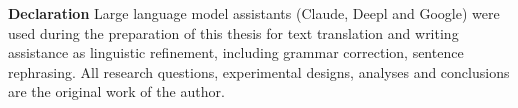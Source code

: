 \documentclass[a4paper,11pt]{article}
\begin{document}














\newpage
{}



\vspace{2cm}
\noindent\textbf{Declaration}
Large language model assistants (Claude, Deepl and Google) were used during the
preparation of this thesis for text translation and writing assistance
as linguistic refinement, including grammar correction, 
sentence rephrasing.  All research questions,
experimental designs, analyses and conclusions are the original work of
the author.
\end{document}

